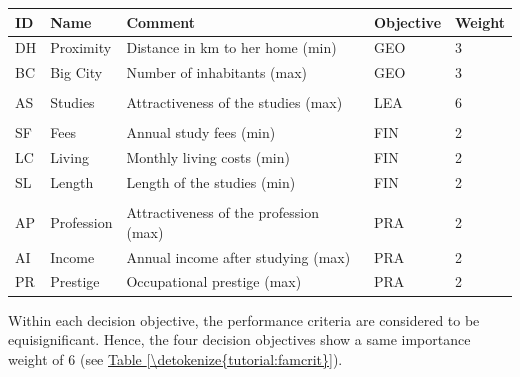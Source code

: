 \documentclass[a4paper,12pt,english]{sphinxhowto}
\begin{document}
\begin{savenotes}\sphinxattablestart
\centering
{}
\sphinxthecaptionisattop
{}\label{\detokenize{tutorial:famcrit}}
\sphinxaftertopcaption
\begin{tabulary}{\linewidth}[t]{|T|T|T|T|T|}
\hline
\sphinxstyletheadfamily 
ID
&\sphinxstyletheadfamily 
Name
&\sphinxstyletheadfamily 
Comment
&\sphinxstyletheadfamily 
Objective
&\sphinxstyletheadfamily 
Weight
\\
\hline
DH
&
Proximity
&
Distance in km to her home (min)
&
GEO
&
3
\\
\hline
BC
&
Big City
&
Number of inhabitants (max)
&
GEO
&
3
\\
\hline

&

&

&

&

\\
\hline
AS
&
Studies
&
Attractiveness of the studies (max)
&
LEA
&
6
\\
\hline

&

&

&

&

\\
\hline
SF
&
Fees
&
Annual study fees (min)
&
FIN
&
2
\\
\hline
LC
&
Living
&
Monthly living costs (min)
&
FIN
&
2
\\
\hline
SL
&
Length
&
Length of the studies (min)
&
FIN
&
2
\\
\hline

&

&

&

&

\\
\hline
AP
&
Profession
&
Attractiveness of the profession (max)
&
PRA
&
2
\\
\hline
AI
&
Income
&
Annual income after studying (max)
&
PRA
&
2
\\
\hline
PR
&
Prestige
&
Occupational prestige (max)
&
PRA
&
2
\\
\hline
\end{tabulary}
\par
\sphinxattableend\end{savenotes}

Within each decision objective, the performance criteria are considered to be equisignificant. Hence, the four decision objectives show a same importance weight of 6 (see \hyperref[\detokenize{tutorial:famcrit}]{Table \ref{\detokenize{tutorial:famcrit}}}).
\end{document}
